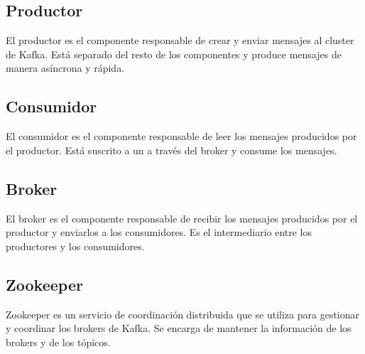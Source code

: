 \subsection{Productor}\label{subsec:productor}
El productor es el componente responsable de crear y enviar mensajes al cluster de Kafka.
Está separado del resto de los componentes y produce mensajes de manera asíncrona y rápida.

\subsection{Consumidor}\label{subsec:consumidor}
El consumidor es el componente responsable de leer los mensajes producidos por el productor.
Está suscrito a un  a través del broker y consume los mensajes.

\subsection{Broker}\label{subsec:broker}
El broker es el componente responsable de recibir los mensajes producidos por el productor y
enviarlos a los consumidores. Es el intermediario entre los productores y los consumidores.

\subsection{Zookeeper}\label{subsec:zookeeper}
Zookeeper es un servicio de coordinación distribuida que se utiliza para gestionar y coordinar
los brokers de Kafka. Se encarga de mantener la información de los brokers y de los tópicos.
